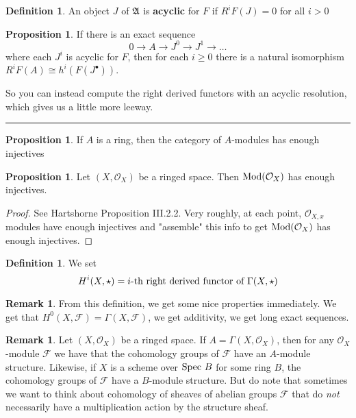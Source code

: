 \documentclass[10pt,reqno]{amsart}
\theoremstyle{definition}
\newtheorem{definition}[theorem]{Definition}
\newtheorem{proposition}[theorem]{Proposition}
\newtheorem{remark}[theorem]{Remark}
\theoremstyle{remark}
\numberwithin{equation}{section}
\numberwithin{theorem}{section}
\newcommand{\OO}{{\mathcal O}}
\newcommand{\spec}{\textup{Spec }}
\newcommand{\FF}{{\mathscr F}}
\begin{document}
\begin{definition} An object $J$ of $\frak{A}$ is \textbf{acyclic} for $F$ if $R^iF(J) = 0$ for all $i > 0$
\end{definition}

\begin{proposition} If there is an exact sequence
\[0 \to A \to J^0 \to J^1 \to \dots\]
where each $J^i$ is acyclic for $F$, then for each $i \ge 0$ there is a natural isomorphism $R^i F(A) \cong h^i(F(J^{\bullet}))$.
\end{proposition}

So you can instead compute the right derived functors with an acyclic resolution, which gives us a little more leeway.
\\

\hrule
\vspace{1em}

\begin{proposition} If $A$ is a ring, then the category of $A$-modules has enough injectives
\end{proposition}

\begin{proposition} Let $(X, \OO_X)$ be a ringed space. Then $\textup{Mod}(\OO_X)$ has enough injectives.
\end{proposition}
\begin{proof}
See Hartshorne Proposition III.2.2. Very roughly, at each point, $\OO_{X,x}$ modules have enough injectives and "assemble" this info to get $\textup{Mod}(\OO_X)$ has enough injectives.
\end{proof}

\begin{definition} We set
\[H^i(X, \star) = \textup{$i$-th right derived functor of $\Gamma(X,\star)$}\]
\end{definition}

\begin{remark} From this definition, we get some nice properties immediately. We get that $H^0(X,\FF) = \Gamma(X,\FF)$, we get additivity, we get long exact sequences.
\end{remark}

\begin{remark}Let $(X,\OO_X)$ be a ringed space. If $A = \Gamma(X,\OO_X)$, then for any $\OO_X$-module $\FF$ we have that the cohomology groups of $\FF$ have an $A$-module structure. Likewise, if $X$ is a scheme over $\spec B$ for some ring $B$, the cohomology groups of $\FF$ have a $B$-module structure. But do note that sometimes we want to think about cohomology of sheaves of abelian groups $\FF$ that do \textit{not} necessarily have a multiplication action by the structure sheaf.
\end{remark}
\end{document}
